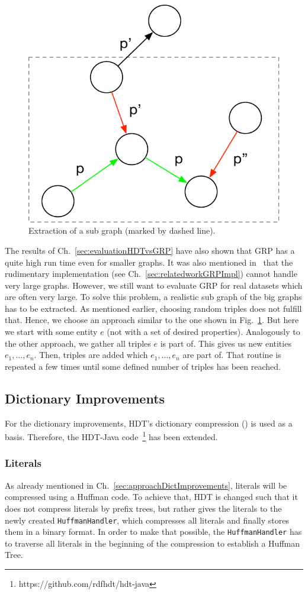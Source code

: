 \begin{figure}
	\centering
	\includegraphics[width=0.4\linewidth]{figures/4_implementation/subgraph}
	\caption{Extraction of a sub graph (marked by dashed line).}
	\label{fig:subgraph}
\end{figure}

The results of Ch.~\ref{sec:evaluationHDTvsGRP} have also shown that GRP has a quite high run time even for smaller graphs. It was also mentioned in~\cite{maneth} that the rudimentary implementation (see Ch.~\ref{sec:relatedworkGRPImpl}) cannot handle very large graphs. However, we still want to evaluate GRP for real datasets which are often very large. To solve this problem, a realistic sub graph of the big graphs has to be extracted. As mentioned earlier, choosing random triples does not fulfill that. Hence, we choose an approach similar to the one shown in Fig.~\ref{fig:subgraph}. But here we start with some entity $e$ (not with a set of desired properties). Analogously to the other approach, we gather all triples $e$ is part of. This gives us new entities $e_1,...,e_n$. Then, triples are added which $e_1,...,e_n$ are part of. That routine is repeated a few times until some defined number of triples has been reached. 



\subsection{Dictionary Improvements}\label{sec:implementationDictImprovements}

For the dictionary improvements, HDT's dictionary compression (\DHDT{}) is used as a basis. Therefore, the HDT-Java code~\footnote{https://github.com/rdfhdt/hdt-java} has been extended.

\subsubsection{Literals}\label{sec:implementationLiterals}

As already mentioned in Ch.~\ref{sec:approachDictImprovements}, literals will be compressed using a Huffman code. To achieve that, HDT is changed such that it does not compress literals by prefix trees, but rather gives the literals to the newly created {\tt HuffmanHandler}, which compresses all literals and finally stores them in a binary format. In order to make that possible, the {\tt HuffmanHandler} has to traverse all literals in the beginning of the compression to establish a Huffman Tree.

